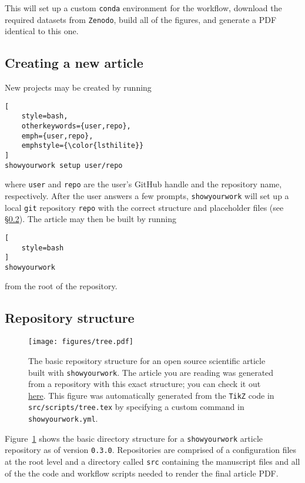 \documentclass[modern]{aastex631}
\newcommand\syw{\texttt{showyourwork}\xspace}
\newcommand\repourl{https://github.com/showyourwork/showyourwork-paper}
\newcommand\commiturl{\repourl/tree/\GitHubSHA}
\begin{document}
\noindent This will set up a custom \texttt{conda} environment for the workflow, download the required datasets from \texttt{Zenodo}, build all of the figures, and generate a PDF identical to this one.

\subsection{Creating a new article}
\label{sec:usage:new}
New projects may be created by running\\

\noindent\begin{minipage}{\linewidth}
\begin{lstlisting}[
    style=bash,
    otherkeywords={user,repo},
    emph={user,repo},
    emphstyle={\color{lsthilite}}
]
showyourwork setup user/repo
\end{lstlisting}
\end{minipage}

\noindent where \texttt{\color{lsthilite}user} and \texttt{\color{lsthilite}repo} are the user's GitHub handle and the repository name, respectively. 
After the user answers a few prompts, \syw will set up a local \texttt{git} repository \texttt{\color{lsthilite}repo} with the correct structure and placeholder files (see \S\ref{sec:usage:struct}).
The article may then be built by running\\

\noindent\begin{minipage}{\linewidth}
\begin{lstlisting}[
    style=bash
]
showyourwork
\end{lstlisting}
\end{minipage}

\noindent from the root of the repository.

\subsection{Repository structure}
\label{sec:usage:struct}
%
\begin{figure}[p!]
    \begin{centering}
        \texttt{[image: figures/tree.pdf]}
        \caption{
            The basic repository structure for an open source scientific article built with \syw.
            The article you are reading was generated from a repository with this exact structure; you can check it out \href{\commiturl}{here}.
            This figure was automatically generated from the \texttt{TikZ} code in \texttt{src/scripts/tree.tex} by specifying a custom command in \texttt{showyourwork.yml}.
        }
        \label{fig:tree}
    \end{centering}
\end{figure}
%
Figure~\ref{fig:tree} shows the basic directory structure for a \syw article repository as of version \texttt{0.3.0}.
Repositories are comprised of a configuration files at the root level and a directory called \texttt{src} containing the manuscript files and all of the the code and workflow scripts needed to render the final article PDF.
\end{document}
